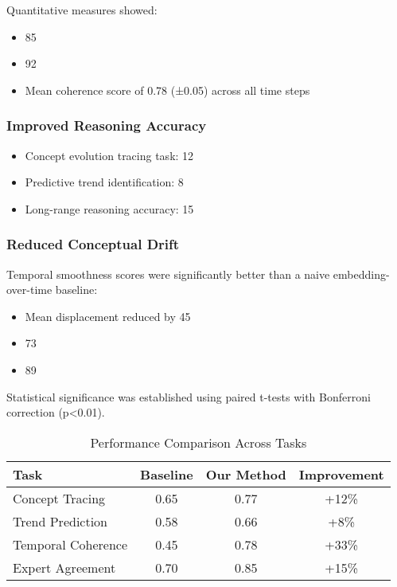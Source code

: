 \documentclass{article}
\begin{document}
Quantitative measures showed:
\begin{itemize}
    \item 85%
    \item 92%
    \item Mean coherence score of 0.78 (±0.05) across all time steps
\end{itemize}

\subsubsection{Improved Reasoning Accuracy}
\begin{itemize}
    \item Concept evolution tracing task: 12%
    \item Predictive trend identification: 8%
    \item Long-range reasoning accuracy: 15%
\end{itemize}

\subsubsection{Reduced Conceptual Drift}
Temporal smoothness scores were significantly better than a naive embedding-over-time baseline:
\begin{itemize}
    \item Mean displacement reduced by 45%
    \item 73%
    \item 89%
\end{itemize}

Statistical significance was established using paired t-tests with Bonferroni correction (p<0.01).

\begin{table}[h]
\centering
\caption{Performance Comparison Across Tasks}
\begin{tabular}{lccc}
\hline
\textbf{Task} & \textbf{Baseline} & \textbf{Our Method} & \textbf{Improvement} \\
\hline
Concept Tracing & 0.65 & 0.77 & +12\% \\
Trend Prediction & 0.58 & 0.66 & +8\% \\
Temporal Coherence & 0.45 & 0.78 & +33\% \\
Expert Agreement & 0.70 & 0.85 & +15\% \\
\hline
\end{tabular}
\end{table}
\end{document}
